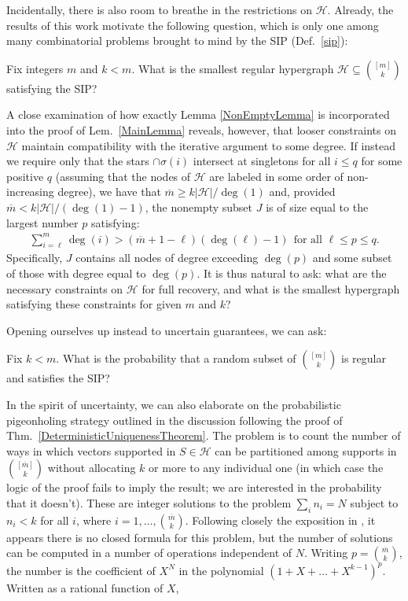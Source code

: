Incidentally, there is also room to breathe in the restrictions on $\mathcal{H}$. Already, the results of this work motivate the following question, which is only one among many combinatorial problems brought to mind by the SIP (Def.~\ref{sip}):
\begin{question}
Fix integers $m$ and $k < m$. What is the smallest regular hypergraph $\mathcal{H} \subseteq {[m] \choose k}$ satisfying the SIP?
\end{question}

A close examination of how exactly Lemma \ref{NonEmptyLemma} is incorporated into the proof of Lem.~\ref{MainLemma} reveals, however, that looser constraints on $\mathcal{H}$ maintain compatibility with the iterative argument to some degree. If instead we require only that the stars $\cap \sigma(i)$ intersect at singletons for all $i \leq q$ for some positive $q$ (assuming that the nodes of $\mathcal{H}$ are labeled in some order of non-increasing degree), we have that $\overline m \geq k|\mathcal{H}| / \deg(1)$ and, provided $\overline m < k|\mathcal{H}| / (\deg(1) - 1)$, the nonempty subset $J$ is of size equal to the largest number $p$ satisfying:
\begin{align*}
\sum_{i=\ell}^{m} \deg(i) > (\overline m + 1 - \ell) (\deg(\ell) - 1) \ \ \text{for all } \ell \leq p \leq q.
\end{align*}
Specifically, $J$ contains all nodes of degree exceeding $\deg(p)$ and some subset of those with degree equal to $\deg(p)$. It is thus natural to ask: what are the necessary constraints on $\mathcal{H}$ for full recovery, and what is the smallest hypergraph satisfying these constraints for given $m$ and $k$?

Opening ourselves up instead to uncertain guarantees, we can ask:
\begin{question}\label{probofsip}
Fix $k < m$. What is the probability that a random subset of ${[m] \choose k}$ is regular and satisfies the SIP?
\end{question}

In the spirit of uncertainty, we can also elaborate on the probabilistic pigeonholing strategy outlined in the discussion following the proof of Thm.~\ref{DeterministicUniquenessTheorem}. The problem is to count the number of ways in which vectors supported in $S \in \mathcal{H}$ can be partitioned among supports in ${[\overline m] \choose k}$ without allocating $k$ or more to any individual one (in which case the logic of the proof fails to imply the result; we are interested in the probability that it doesn't). These are integer solutions to the problem $\sum_i n_i = N$ subject to $n_i < k$ for all $i$, where $i = 1, \ldots, {\overline m \choose k}$. Following closely the exposition in \cite{stackexchangeanswer}, it appears there is no closed formula for this problem, but the number of solutions can be computed in a number of operations independent of $N$. Writing $p = {\overline m \choose k}$, the number is the coefficient of $X^N$ in the polynomial $(1 + X + \ldots + X^{k-1})^p$. Written as a rational function of $X$, 

